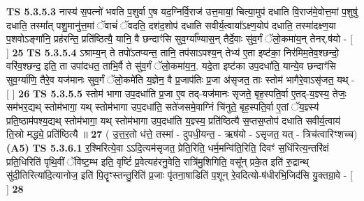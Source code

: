 \documentclass[17pt]{extarticle}
\begin{document}
                  \newline
                                \textbf{ TS 5.3.5.3} \newline
                  नास्य॑ स॒पत्नो॑ भवति प॒शुर्वा ए॒ष यद॒ग्निर्वि॒राज॑ उत्त॒मायां॒ चित्या॒मुप॑ दधाति वि॒राज॑मे॒वोत्त॒मां प॒शुषु॑ दधाति॒ तस्मा᳚त् पशु॒मानु॑त्त॒मां ॅवाचं॑ ॅवदति॒ दश॑द॒शोप॑ दधाति सवीर्य॒त्वाया᳚ऽक्ष्ण॒योप॑ दधाति॒ तस्मा॑दक्ष्ण॒या प॒शवोऽङ्गा॑नि॒ प्रह॑रन्ति॒ प्रति॑ष्ठित्यै॒ यानि॒ वै छन्दाꣳ॑सि सुव॒र्ग्या᳚ण्यास॒न् तैर्दे॒वाः सु॑व॒र्गं ॅलो॒कमा॑य॒न् तेनर्.ष॑यो - [  ] \textbf{  25} \newline
                  \newline
                                \textbf{ TS 5.3.5.4} \newline
                  ऽश्राम्य॒न् ते तपो॑ऽतप्यन्त॒ तानि॒ तप॑साऽपश्य॒न् तेभ्य॑ ए॒ता इष्ट॑का॒ निर॑मिम॒तेव॒श्छन्दो॒ वरि॑व॒श्छन्द॒ इति॒ ता उपा॑दधत॒ ताभि॒र्वै ते सु॑व॒र्गं ॅलो॒कमा॑य॒न॒. यदे॒ता इष्ट॑का उप॒दधा॑ति॒ यान्ये॒व छन्दाꣳ॑सि सुव॒र्ग्या॑णि॒ तैरे॒व यज॑मानः सुव॒र्गं ॅलो॒कमे॑ति य॒ज्ञेन॒ वै प्र॒जाप॑तिः प्र॒जा अ॑सृजत॒ ताः स्तोम॑ भागैरे॒वाऽसृ॑जत॒ यथ् - [  ] \textbf{  26} \newline
                  \newline
                                \textbf{ TS 5.3.5.5} \newline
                  स्तोम॑ भागा उप॒दधा॑ति प्र॒जा ए॒व तद्-यज॑मानः सृजते॒ बृह॒स्पति॒र्वा ए॒तद्-य॒ज्ञ्स्य॒ तेजः॒ सम॑भर॒द्यथ् स्तोम॑भागा॒ यथ् स्तोम॑भागा उप॒दधा॑ति॒ सते॑जसमे॒वाग्निं चि॑नुते॒ बृह॒स्पति॒र्वा ए॒तां ॅय॒ज्ञ्स्य॑ प्रति॒ष्ठाम॑पश्य॒द्यथ् स्तोम॑भागा॒ यथ् स्तोम॑भागा उप॒दधा॑ति य॒ज्ञ्स्य॒ प्रति॑ष्ठित्यै स॒प्तस॒प्तोप॑ दधाति सवीर्य॒त्वाय॑ ति॒स्रो मद्ध्ये॒ प्रति॑ष्ठित्यै ॥ \textbf{  27 } \newline
                  \newline
                      ( उ॒त्त॒र॒तो ध॑त्ते॒ तस्मा॑ - दुपधी॒यन्त॒ - ऋष॑यो - ऽसृजत॒ यत् - त्रिच॑त्वारिꣳशच्च)  \textbf{(A5)} \newline \newline
                                        \textbf{ TS 5.3.6.1} \newline
                  र॒श्मिरित्ये॒वा ऽऽदि॒त्यम॑सृजत॒ प्रेति॒रिति॒ धर्म॒मन्वि॑ति॒रिति॒ दिवꣳ॑ स॒धिंरित्य॒न्तरि॑क्षं प्रति॒धिरिति॑ पृथि॒वीं ॅवि॑ष्ट॒म्भ इति॒ वृष्टिं॑ प्र॒वेत्यह॑रनु॒वेति॒ रात्रि॑मु॒शिगिति॒ वसू᳚न् प्रके॒त इति॑ रु॒द्रान्थ् सु॑दी॒तिरित्या॑दि॒त्यानोज॒ इति॑ पि॒तॄꣳस्तन्तु॒रिति॑ प्र॒जाः पृ॑तना॒षाडिति॑ प॒शून् रे॒वदित्यो-ष॑धीरभि॒जिद॑सि यु॒क्तग्रा॒वे - [  ] \textbf{  28} \newline
\end{document}
